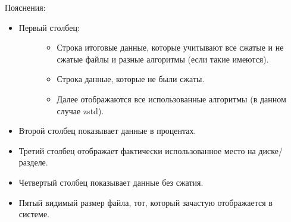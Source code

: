 \documentclass[letterpaper,10pt,russian,openany]{sphinxmanual}
\begin{document}
\sphinxAtStartPar
Пояснения:
\begin{itemize}
\item {} \begin{description}
\item[{Первый столбец:}] \leavevmode\begin{itemize}
\item {} 
\sphinxAtStartPar
Строка  \sphinxhyphen{} итоговые данные, которые учитывают все сжатые и не сжатые файлы и разные алгоритмы (если такие имеются).

\item {} 
\sphinxAtStartPar
Строка  \sphinxhyphen{} данные, которые не были сжаты.

\item {} 
\sphinxAtStartPar
Далее отображаются все использованные алгоритмы (в данном случае \sphinxhyphen{} zstd).

\end{itemize}

\end{description}

\item {} 
\sphinxAtStartPar
Второй столбец показывает данные в процентах.

\item {} 
\sphinxAtStartPar
Третий столбец отображает фактически использованное место на диске/разделе.

\item {} 
\sphinxAtStartPar
Четвертый столбец показывает данные без сжатия.

\item {} 
\sphinxAtStartPar
Пятый \sphinxhyphen{} видимый размер файла, тот, который зачастую отображается в системе.

\end{itemize}

\ignorespaces 
\end{document}
